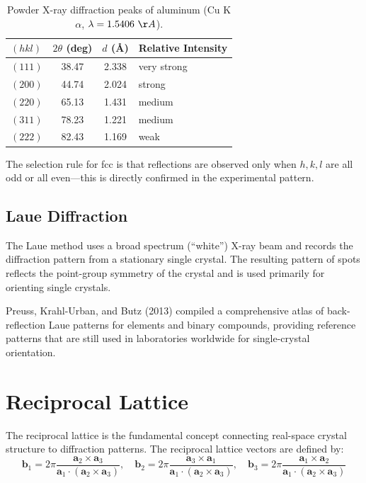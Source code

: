 \begin{table}[H]
\centering
\caption{Powder X-ray diffraction peaks of aluminum (Cu K$\alpha$, $\lambda = 1.5406~\AA{}$).}
\label{tab:al_xrd}
\begin{tabular}{@{}lSSl@{}}
\toprule
$(hkl)$ & {$2\theta$ (deg)} & {$d$ (\AA{})} & Relative Intensity \\
\midrule
$(111)$ & 38.47 & 2.338 & very strong \\
$(200)$ & 44.74 & 2.024 & strong \\
$(220)$ & 65.13 & 1.431 & medium \\
$(311)$ & 78.23 & 1.221 & medium \\
$(222)$ & 82.43 & 1.169 & weak \\
\bottomrule
\end{tabular}
\end{table}

The selection rule for fcc is that reflections are observed only when $h, k, l$ are all odd or all even---this is directly confirmed in the experimental pattern.

\subsection{Laue Diffraction}

The Laue method uses a broad spectrum (``white'') X-ray beam and records the diffraction pattern from a stationary single crystal. The resulting pattern of spots reflects the point-group symmetry of the crystal and is used primarily for orienting single crystals.

Preuss, Krahl-Urban, and Butz (2013) compiled a comprehensive atlas of back-reflection Laue patterns for elements and binary compounds, providing reference patterns that are still used in laboratories worldwide for single-crystal orientation.


\section{Reciprocal Lattice}

The reciprocal lattice is the fundamental concept connecting real-space crystal structure to diffraction patterns. The reciprocal lattice vectors are defined by:
\begin{equation}
  \mathbf{b}_1 = 2\pi \frac{\mathbf{a}_2 \times \mathbf{a}_3}{\mathbf{a}_1 \cdot (\mathbf{a}_2 \times \mathbf{a}_3)}, \quad
  \mathbf{b}_2 = 2\pi \frac{\mathbf{a}_3 \times \mathbf{a}_1}{\mathbf{a}_1 \cdot (\mathbf{a}_2 \times \mathbf{a}_3)}, \quad
  \mathbf{b}_3 = 2\pi \frac{\mathbf{a}_1 \times \mathbf{a}_2}{\mathbf{a}_1 \cdot (\mathbf{a}_2 \times \mathbf{a}_3)}
\end{equation}


